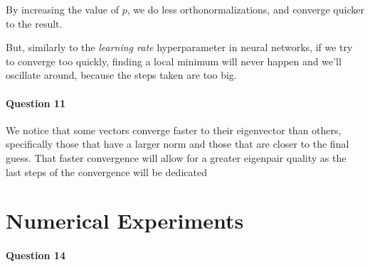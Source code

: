 \documentclass{article}
\begin{document}
By increasing the value of $p$, we do less orthonormalizations, and converge quicker to the result.

But, similarly to the \emph{learning rate} hyperparameter in neural networks, if we try to converge too quickly, finding a local minimum will never happen and we'll oscillate around, because the steps taken are too big.

\paragraph{Question 11}

We notice that some vectors converge faster to their eigenvector than others, specifically those that have a larger norm and those that are closer to the final guess. That faster convergence will allow for a greater eigenpair quality as the last steps of the convergence will be dedicated

\section{Numerical Experiments}

\paragraph{Question 14}
\end{document}
